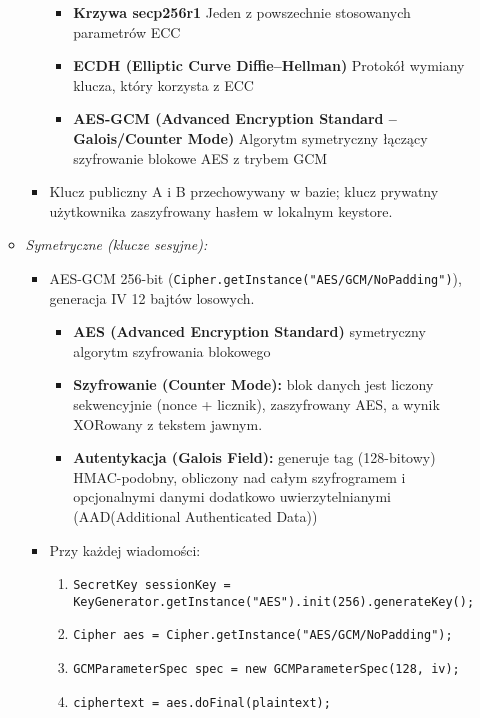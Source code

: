 \documentclass[a4paper,12pt]{article}
\begin{document}
\begin{itemize}
\begin{itemize}
\begin{itemize}
\begin{itemize}
                \item \textbf{Krzywa secp256r1} Jeden z powszechnie stosowanych parametrów ECC
                \item \textbf{ECDH (Elliptic Curve Diffie–Hellman)} Protokół wymiany klucza, który korzysta z ECC
                \item \textbf{AES-GCM (Advanced Encryption Standard – Galois/Counter Mode)} Algorytm symetryczny łączący szyfrowanie blokowe AES z trybem GCM
            \end{itemize}
            \item   Klucz publiczny A i B przechowywany w bazie; klucz prywatny użytkownika zaszyfrowany hasłem w lokalnym keystore.
        \end{itemize}
        \item \emph{Symetryczne (klucze sesyjne):}
        \begin{itemize}
            \item   AES-GCM 256-bit (\texttt{Cipher.getInstance("AES/GCM/NoPadding")}), generacja IV 12 bajtów losowych.
            \begin{itemize}
                \item \textbf{AES (Advanced Encryption Standard)} symetryczny algorytm szyfrowania blokowego
                \item \textbf{Szyfrowanie (Counter Mode):} blok danych jest liczony sekwencyjnie (nonce + licznik), zaszyfrowany AES, a wynik XORowany z tekstem jawnym.
                \item \textbf{Autentykacja (Galois Field):}  generuje tag (128-bitowy) HMAC-podobny, obliczony nad całym szyfrogramem i opcjonalnymi danymi dodatkowo uwierzytelnianymi (AAD(Additional Authenticated Data))
            \end{itemize}
            \item   Przy każdej wiadomości:
            \begin{enumerate}
                \item   \texttt{SecretKey sessionKey = KeyGenerator.getInstance("AES").init(256).generateKey();}
                \item   \texttt{Cipher aes = Cipher.getInstance("AES/GCM/NoPadding");}
                \item   \texttt{GCMParameterSpec spec = new GCMParameterSpec(128, iv);}
                \item   \texttt{ciphertext = aes.doFinal(plaintext);}
            \end{enumerate}
        \end{itemize}

\end{itemize}
\end{itemize}
\end{document}
